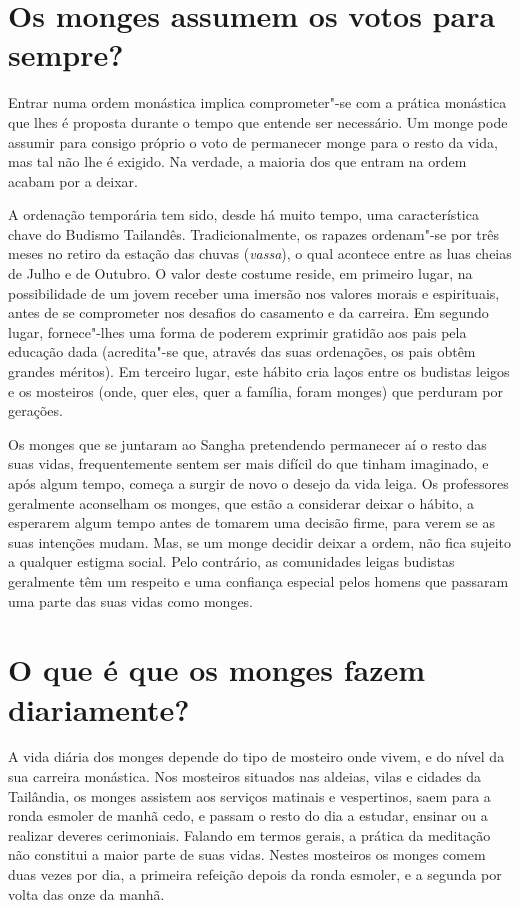 \section{Os monges assumem os votos para sempre?}

Entrar numa ordem monástica implica comprometer"-se com a prática
monástica que lhes é proposta durante o tempo que entende ser necessário.
Um monge pode assumir para consigo próprio o voto de permanecer monge
para o resto da vida, mas tal não lhe é exigido. Na verdade, a maioria
dos que entram na ordem acabam por a deixar.

A ordenação temporária tem sido, desde há muito tempo, uma
característica chave do Budismo Tailandês. Tradicionalmente, os rapazes
ordenam"-se por três meses no retiro da estação das chuvas
(\emph{vassa}), o qual acontece entre as luas cheias de Julho e de
Outubro. O valor deste costume reside, em primeiro lugar, na
possibilidade de um jovem receber uma imersão nos valores morais e
espirituais, antes de se comprometer nos desafios do casamento e da
carreira. Em segundo lugar, fornece"-lhes uma forma de poderem exprimir
gratidão aos pais pela educação dada (acredita"-se que, através das suas
ordenações, os pais obtêm grandes méritos). Em terceiro lugar, este
hábito cria laços entre os budistas leigos e os mosteiros (onde, quer
eles, quer a família, foram monges) que perduram por gerações.

Os monges que se juntaram ao Sangha pretendendo permanecer aí o resto
das suas vidas, frequentemente sentem ser mais difícil do que tinham
imaginado, e após algum tempo, começa a surgir de novo o desejo da vida
leiga. Os professores geralmente aconselham os monges, que estão a
considerar deixar o hábito, a esperarem algum tempo antes de tomarem uma
decisão firme, para verem se as suas intenções mudam. Mas, se um monge
decidir deixar a ordem, não fica sujeito a qualquer estigma social. Pelo
contrário, as comunidades leigas budistas geralmente têm um respeito e
uma confiança especial pelos homens que passaram uma parte das suas
vidas como monges.

\section{O que é que os monges fazem diariamente?}

A vida diária dos monges depende do tipo de mosteiro onde vivem, e do
nível da sua carreira monástica. Nos mosteiros situados nas aldeias,
vilas e cidades da Tailândia, os monges assistem aos serviços matinais e
vespertinos, saem para a ronda esmoler de manhã cedo, e passam o resto
do dia a estudar, ensinar ou a realizar deveres cerimoniais. Falando em
termos gerais, a prática da meditação não constitui a maior parte de
suas vidas. Nestes mosteiros os monges comem duas vezes por dia, a
primeira refeição depois da ronda esmoler, e a segunda por volta das
onze da manhã.

